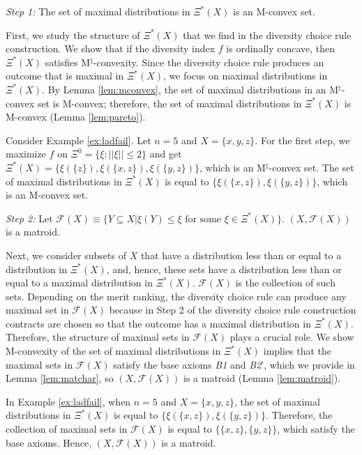 \documentclass[12pt]{amsart}
\theoremstyle{remark}
\newcommand{\norm}[1]{|| #1 ||}
\begin{document}
\noindent
\emph{Step 1:} The set of maximal distributions in $\Xi^*(X)$ is an M-convex set.

First, we study the structure of  $\Xi^*(X)$ that we
find in the diversity choice rule construction. We show
that if the diversity index $f$ is ordinally
concave, then $\Xi^{*}(X)$ satisfies M$^{\natural}$-convexity. Since
the diversity choice rule produces an outcome that is maximal
in $\Xi^{*}(X)$, we focus on maximal distributions in $\Xi^{*}(X)$.
By Lemma \ref{lem:mconvex}, the set of maximal distributions in an
M$^{\natural}$-convex set is M-convex; therefore, the
set of maximal distributions in $\Xi^{*}(X)$ is M-convex (Lemma \ref{lem:pareto}).

Consider Example \ref{ex:ladfail}. Let $n=5$ and $X=\{x,y,z\}$. For the first step,
we maximize $f$ on
$\Xi^0=\{\xi:\norm{\xi} \leq 2\}$ and get $\Xi^*(X)=\{\xi(\{z\}),\xi(\{x,z\}),
\xi(\{y,z\})\}$, which is an M$^{\natural}$-convex set. The set of
maximal distributions in $\Xi^*(X)$ is equal to $\{\xi(\{x,z\}),\xi(\{y,z\})\}$,
which is an M-convex set.



\medskip

\noindent
\emph{Step 2:} Let $\mathcal{F}(X) \equiv \{Y \subseteq X | \xi(Y)
\leq \xi \mbox{ for some } \xi \in \Xi^*(X)\}$. $(X,\mathcal{F}(X))$ is a matroid.

Next, we consider subsets of $X$ that have a distribution less than or
equal to a distribution in $\Xi^*(X)$, and, hence, these sets have
a distribution less than or equal to a maximal distribution in $\Xi^*(X)$.
$\mathcal{F}(X)$ is the collection of such sets.
Depending on the merit ranking, the diversity choice rule can produce
any maximal set in $\mathcal{F}(X)$ because in Step 2 of the diversity choice rule
construction contracts are chosen so
that the outcome has a maximal distribution in $\Xi^*(X)$.
Therefore, the structure of maximal
sets in $\mathcal{F}(X)$ plays a crucial role. We show M-convexity of
the set of maximal distributions in $\Xi^*(X)$ implies that the maximal
sets in $\mathcal{F}(X)$ satisfy the base axioms \emph{B1} and \emph{B2}',
which we provide in Lemma \ref{lem:matchar}, so $(X, \mathcal{F}(X))$ is a matroid
(Lemma \ref{lem:matroid}).

In Example \ref{ex:ladfail}, when $n=5$ and $X=\{x,y,z\}$, the set
of maximal distributions in
$\Xi^*(X)$ is equal to $\{\xi(\{x,z\}),\xi(\{y,z\})\}$. Therefore, the
collection of maximal sets in $\mathcal{F}(X)$ is equal to $\{\{x,z\},\{y,z\}\}$,
which satisfy the base axioms. Hence, $(X, \mathcal{F}(X))$ is a matroid.
\end{document}
